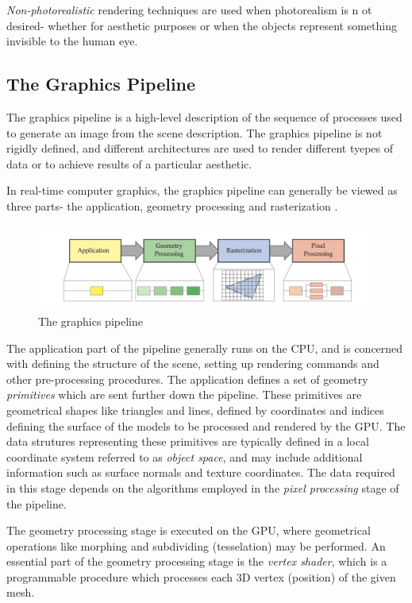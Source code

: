 \documentclass{article}
\begin{document}
\textit{Non-photorealistic} rendering techniques are used when photorealism is n    ot desired- whether for aesthetic purposes or when the objects represent something
invisible to the human eye. 

\subsection{The Graphics Pipeline}
The graphics pipeline is a high-level description of the sequence of processes used to 
generate an image from the scene description. The graphics pipeline is not rigidly defined,
and different architectures are used to render different tyepes of data or to achieve results of a particular aesthetic.

In real-time computer graphics, the graphics pipeline can generally be viewed as three parts- the application, geometry processing and rasterization \cite{RealTimeRendering}.

\begin{figure}[tbh]
    \centering
    \includegraphics[width=1.0\textwidth]{images/graphics_pipeline.png}
    \caption{The graphics pipeline \cite{RealTimeRendering}}
    \label{fig:pipelineRealTimeRendering}
\end{figure}

The application part of the pipeline generally runs on the CPU, and is concerned with defining the structure of the scene, setting up rendering commands and other pre-processing procedures.
The application defines a set of geometry \textit{primitives} which are sent further down the pipeline. These primitives
are geometrical shapes like triangles and lines, defined by coordinates and indices defining the surface of the models to be processed and rendered by the GPU.
The data strutures representing these primitives are typically defined in a local coordinate system referred to as \textit{object space}, and may include additional information such as surface normals and texture coordinates. The data required
in this stage depends on the algorithms employed in the \textit{pixel processing} stage of the pipeline.

The geometry processing stage is executed on the GPU, where geometrical operations like morphing and subdividing (tesselation) may be performed.
An essential part of the geometry processing stage is the \textit{vertex shader}, which is a programmable procedure which processes each 3D vertex (position) of the given mesh.
\end{document}
